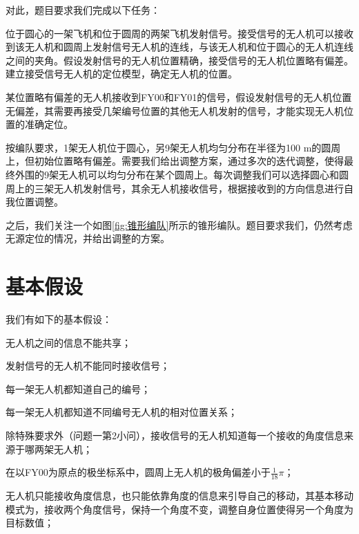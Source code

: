 \documentclass[12pt,AutoFakeSlant,AutoFakeBold]{article}
\begin{document}
对此，题目要求我们完成以下任务：
\begin{enumerate*}
    \item 位于圆心的一架飞机和位于圆周的两架飞机发射信号。接受信号的无人机可以接收到该无人机和圆周上发射信号无人机的连线，与该无人机和位于圆心的无人机连线之间的夹角。假设发射信号的无人机位置精确，接受信号的无人机位置略有偏差。建立接受信号无人机的定位模型，确定无人机的位置。
    \item 某位置略有偏差的无人机接收到FY00和FY01的信号，假设发射信号的无人机位置无偏差，其需要再接受几架编号位置的其他无人机发射的信号，才能实现无人机位置的准确定位。
    \item 按编队要求，1架无人机位于圆心，另9架无人机均匀分布在半径为100 m的圆周上，但初始位置略有偏差。需要我们给出调整方案，通过多次的迭代调整，使得最终外围的9架无人机可以均匀分布在某个圆周上。每次调整我们可以选择圆心和圆周上的三架无人机发射信号，其余无人机接收信号，根据接收到的方向信息进行自我位置调整。
\end{enumerate*}

之后，我们关注一个如图\ref{fig:锥形编队}所示的锥形编队。题目要求我们，仍然考虑无源定位的情况，并给出调整的方案。


\section{基本假设}

我们有如下的基本假设：
\begin{itemize*}
    \item 无人机之间的信息不能共享；
    \item 发射信号的无人机不能同时接收信号；
    \item 每一架无人机都知道自己的编号；
    \item 每一架无人机都知道不同编号无人机的相对位置关系；
    \item 除特殊要求外（问题一第2小问），接收信号的无人机知道每一个接收的角度信息来源于哪两架无人机；
    \item 在以FY00为原点的极坐标系中，圆周上无人机的极角偏差小于$\frac{1}{18}\pi$；
    \item 无人机只能接收角度信息，也只能依靠角度的信息来引导自己的移动，其基本移动模式为，接收两个角度信号，保持一个角度不变，调整自身位置使得另一个角度为目标数值；
\end{itemize*}
\end{document}
